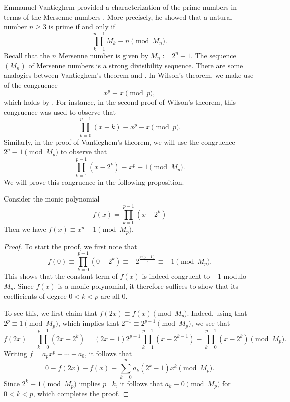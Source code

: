 Emmanuel Vantieghem provided a characterization of the prime numbers in terms of the Mersenne numbers \cite{vantieghem1991}. More precisely, he showed that a natural number $n\geq 3$ is prime if and only if
\begin{equation*}
  \prod_{k=1}^{n-1}M_k \equiv n\pmod{M_n}.
\end{equation*}
Recall that the $n$\supth{} Mersenne number is given by $M_n:=2^n-1$. The sequence $(M_n)$ of Mersenne numbers is a strong divisibility sequence. There are some analogies between Vantieghem's theorem and . In Wilson's theorem, we make use of the congruence
\begin{equation*}
  x^p\equiv x\pmod{p},
\end{equation*}
which holds by . For instance, in the second proof of Wilson's theorem, this congruence was used to observe that
\begin{equation*}
  \prod_{k=0}^{p-1}(x-k)\equiv x^p-x\pmod{p}.
\end{equation*}
Similarly, in the proof of Vantieghem's theorem, we will use the congruence $2^p\equiv 1\pmod{M_p}$ to observe that
\begin{equation*}
  \prod_{k=1}^{p-1}(x-2^k)\equiv x^{p}-1\pmod{M_p}.
\end{equation*}
We will prove this congruence in the following proposition.

\begin{proposition}\label{proposition:vantieghem}
  Consider the monic polynomial
  \begin{equation*}
    f(x)=\prod_{k=0}^{p-1}(x-2^k)
  \end{equation*}
  Then we have $f(x)\equiv x^p-1\pmod{M_p}$.
\end{proposition}

\begin{proof}
  To start the proof, we first note that
  \begin{equation*}
    f(0)\equiv\prod_{k=0}^{p-1}(0-2^k)\equiv -2^{\frac{p(p-1)}{2}}\equiv -1\pmod{M_p}.
  \end{equation*}
  This shows that the constant term of $f(x)$ is indeed congruent to $-1$ modulo $M_p$. Since $f(x)$ is a monic polynomial, it therefore suffices to show that its coefficients of degree $0<k<p$ are all $0$.
  
  To see this, we first claim that $f(2x)\equiv f(x)\pmod{M_p}$. Indeed, using that $2^p\equiv 1\pmod{M_p}$, which implies that $2^{-1}\equiv 2^{p-1}\pmod{M_p}$, we see that
  \begin{equation*}
    f(2x)=\prod_{k=0}^{p-1}(2x-2^k)=(2x-1)2^{p-1}\prod_{k=1}^{p-1}(x-2^{k-1})\equiv\prod_{k=0}^{p-1}(x-2^k) \pmod{M_p}.
  \end{equation*}
  Writing $f=a_{p}x^p+\cdots+a_0$, it follows that
  \begin{equation*}
    0\equiv f(2x)-f(x)\equiv \sum_{k=0}^{p}a_k(2^k-1)x^k \pmod{M_p}.
  \end{equation*}
  Since $2^k\equiv 1\pmod{M_p}$ implies $p\mid k$, it follows that $a_k\equiv 0\pmod{M_p}$ for $0<k<p$, which completes the proof.
\end{proof}

